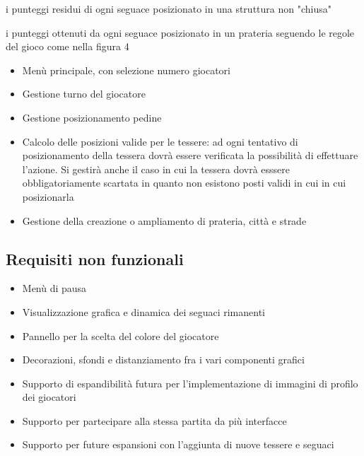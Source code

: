\subitem i punteggi residui di ogni seguace posizionato in una struttura non "chiusa"

\subitem i punteggi ottenuti da ogni seguace posizionato in un prateria seguendo le regole del gioco come nella figura 4



\begin{itemize}
\item Menù principale, con selezione numero giocatori
\end{itemize}
\begin{itemize}
\item Gestione turno del giocatore
\end{itemize}
\begin{itemize}
\item Gestione posizionamento pedine
\end{itemize}
\begin{itemize}
\item Calcolo delle posizioni valide per le tessere: ad ogni tentativo di posizionamento della tessera dovrà essere verificata la possibilità di effettuare l'azione. Si gestirà anche il caso in cui la tessera dovrà esssere obbligatoriamente scartata in quanto non esistono posti validi in cui in cui posizionarla
\end{itemize}
\begin{itemize}
\item Gestione della creazione o ampliamento di prateria, città e strade
\end{itemize}

\subsection*{Requisiti non funzionali}
\begin{itemize}
\item Menù di pausa
\end{itemize}
\begin{itemize}
\item Visualizzazione grafica e dinamica dei seguaci rimanenti 
\end{itemize}
\begin{itemize}
\item Pannello per la scelta del colore del giocatore
\end{itemize}
\begin{itemize}
\item Decorazioni, sfondi e distanziamento fra i vari componenti grafici
\end{itemize}
\begin{itemize}
\item Supporto di espandibilità futura per l'implementazione di immagini di profilo dei giocatori
\end{itemize}
\begin{itemize}
\item Supporto per partecipare alla stessa partita da più interfacce
\end{itemize}
\begin{itemize}
\item Supporto per future espansioni con l'aggiunta di nuove tessere e seguaci
\end{itemize}

